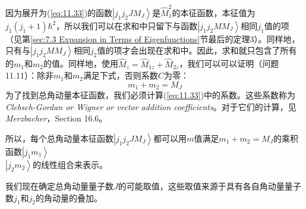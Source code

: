     因为展开为(\ref{eq:11.33})的函数$\left| j_1 j_2 J M_J \right\rangle$是$\hat{M}_1^2$的本征函数，本征值为$j_1 \left(j_1 + 1\right)\hbar^2$，所以我们可以在求和中只留下与函数$\left| j_1 j_2 M M_J \right\rangle$相同$j_1$值的项（见第\ref{sec:7.3 Expansion in Terms of Eigenfunctions}节最后的定理3）。同样地，只有与$\left| j_1 j_2 M M_J \right\rangle$相同$j_2$值的项才会出现在求和中。因此，求和就只包含了所有的$m_1$和$m_2$的值。同样地，使用$\hat{M}_z = \hat{M}_{1z} + \hat{M}_{2z}$，我们可以可以证明（问题11.11）：除非$m_1$和$m_2$满足下式，否则系数$C$为零：
    \begin{equation}
        \boxed{
            m_1 + m_2 = M_J
        }
        \label{eq:11.34}
    \end{equation}
    为了找到总角动量本征函数，我们必须计算(\ref{eq:11.33})中的系数。这些系数称为\textit{Clebsch-Gordan or Wigner or vector addition coefficients}。对于它们的计算，见\textit{Merzbacher}，Section 16.6。

    所以，每个总角动量本征函数$\left| j_1 j_2 J M_J \right\rangle$都可以用$m$值满足$m_1 + m_2 = M_J$的乘积函数$\left| j_1 m_1 \right\rangle $\\$\left| j_2 m_2 \right\rangle$的线性组合来表示。

    我们现在确定总角动量量子数$J$的可能取值，这些取值来源于具有各自角动量量子数$j_1$和$j_2$的角动量的叠加。

